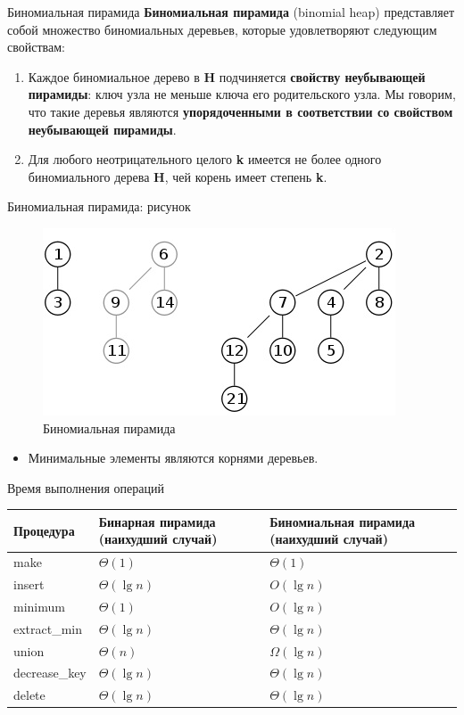 \begin{frame}{Биномиальная пирамида}
	\textbf{Биномиальная пирамида} (binomial heap) представляет собой множество
	биномиальных деревьев, которые удовлетворяют следующим свойствам:
	\begin{enumerate}
		\item Каждое биномиальное дерево в \textbf{H} подчиняется \textbf{свойству неубывающей пирамиды}:
		ключ узла не меньше ключа его родительского узла. 
		Мы говорим, что такие деревья являются \textbf{упорядоченными в соответствии со свойством 
		неубывающей пирамиды}.
		\item Для любого неотрицательного целого \textbf{k} имеется не более одного биномиального дерева 
		\textbf{H}, чей корень имеет степень \textbf{k}.
	\end{enumerate}
\end{frame}

\begin{frame}{Биномиальная пирамида: рисунок}
	\begin{figure}
		\includegraphics[width=0.6\linewidth]{images/binom-heap.png}
		\caption{Биномиальная пирамида}
	\end{figure}
	\begin{itemize}
		\item Минимальные элементы являются корнями деревьев.
	\end{itemize}
\end{frame}
	

\begin{frame}{Время выполнения операций}
	\centering
	\begin{tabular}{ |p{3cm}||p{3cm}|p{3cm}|  }
		\hline \textbf{Процедура} & \textbf{Бинарная пирамида} (наихудший случай) & \textbf{Биномиальная	пирамида} (наихудший случай) \\
		\hline
		make         & $\Theta(1)$    &$\Theta(1)$     \\
		insert       & $\Theta(\lg n)$& $O(\lg n)$     \\
		minimum      & $\Theta(1)$    & $O(\lg n)$     \\
		extract\_min & $\Theta(\lg n)$& $\Theta(\lg n)$\\
		union        & $\Theta(n)$    & $\Omega(\lg n)$\\
		decrease\_key& $\Theta(\lg n)$& $\Theta(\lg n)$\\
		delete       & $\Theta(\lg n)$& $\Theta(\lg n)$\\
		\hline
	\end{tabular}
\end{frame}

